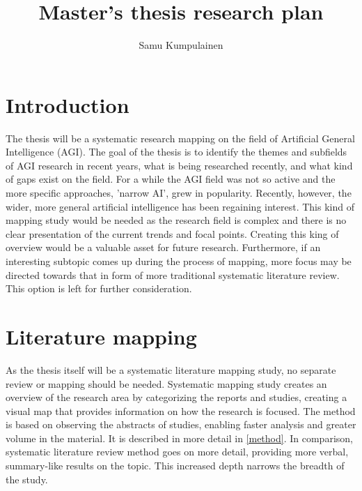 \documentclass[utf8,english]{gradu3}
\begin{document}
\title{Master's thesis research plan}

\author{Samu Kumpulainen}

\maketitle

\mainmatter

\section{Introduction}
The thesis will be a systematic research mapping on the field of Artificial General Intelligence (AGI). The goal of the thesis is to identify the themes and subfields of AGI research in recent years, what is being researched recently, and what kind of gaps exist on the field. For a while the AGI field was not so active and the more specific approaches, 'narrow AI', grew in popularity. Recently, however, the wider, more general artificial intelligence has been regaining interest. This kind of mapping study would be needed as the research field is complex and there is no clear presentation of the current trends and focal points. Creating this king of overview would be a valuable asset for future research. Furthermore, if an interesting subtopic comes up during the process of mapping, more focus may be directed towards that in form of more traditional systematic literature review. This option is left for further consideration.


\section{Literature mapping} 
As the thesis itself will be a systematic literature mapping study, no separate review or mapping should be needed. Systematic mapping study creates an overview of the research area by categorizing the reports and studies, creating a visual map that provides information on how the research is focused. The method is based on observing the abstracts of studies, enabling faster analysis and greater volume in the material. It is described in more detail in \ref{method}. In comparison, systematic literature review method goes on more detail, providing more verbal, summary-like results on the topic. This increased depth narrows the breadth of the study. 
\end{document}
